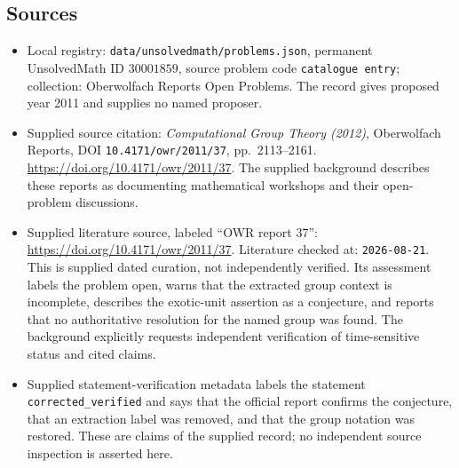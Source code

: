 \documentclass[11pt]{article}
\begin{document}
\subsection{Sources}
\begin{itemize}
\item Local registry: \texttt{data/unsolvedmath/problems.json}, permanent UnsolvedMath ID \(30001859\), source problem code \texttt{catalogue entry}; collection: Oberwolfach Reports Open Problems. The record gives proposed year 2011 and supplies no named proposer.
\item Supplied source citation: \emph{Computational Group Theory (2012)}, Oberwolfach Reports, DOI \texttt{10.4171/owr/2011/37}, pp.\ 2113--2161. \url{https://doi.org/10.4171/owr/2011/37}. The supplied background describes these reports as documenting mathematical workshops and their open-problem discussions.
\item Supplied literature source, labeled ``OWR report 37'': \url{https://doi.org/10.4171/owr/2011/37}. Literature checked at: \texttt{2026-08-21}. This is supplied dated curation, not independently verified. Its assessment labels the problem open, warns that the extracted group context is incomplete, describes the exotic-unit assertion as a conjecture, and reports that no authoritative resolution for the named group was found. The background explicitly requests independent verification of time-sensitive status and cited claims.
\item Supplied statement-verification metadata labels the statement \texttt{corrected\_verified} and says that the official report confirms the conjecture, that an extraction label was removed, and that the group notation was restored. These are claims of the supplied record; no independent source inspection is asserted here.
\end{itemize}
\end{document}
